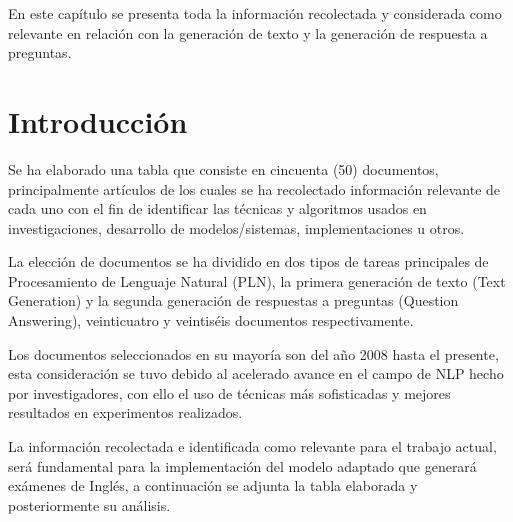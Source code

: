 \documentclass[../Main.tex]{subfiles}
\begin{document}
\begin{justify}
En este capítulo se presenta toda la información recolectada y considerada como relevante en relación con la generación de texto y la generación de respuesta a preguntas.
\end{justify}

\section{Introducción}
\begin{justify}
Se ha elaborado una tabla que consiste en cincuenta (50) documentos, principalmente artículos de los cuales se ha recolectado información relevante de cada uno con el fin de identificar las técnicas y algoritmos usados en investigaciones, desarrollo de modelos/sistemas, implementaciones u otros.
\end{justify}

\begin{justify}
La elección de documentos se ha dividido en dos tipos de tareas principales de Procesamiento de Lenguaje Natural (PLN), la primera generación de texto (Text Generation) y la segunda generación de respuestas a preguntas (Question Answering), veinticuatro y veintiséis documentos respectivamente.
\end{justify}

\begin{justify}
Los documentos seleccionados en su mayoría son del año 2008 hasta el presente, esta consideración se tuvo debido al acelerado avance en el campo de NLP hecho por investigadores, con ello el uso de técnicas más sofisticadas y mejores resultados en experimentos realizados.
\end{justify}

\begin{justify}
La información recolectada e identificada como relevante para el trabajo actual, será fundamental para la implementación del modelo adaptado que generará exámenes de Inglés, a continuación se adjunta la tabla elaborada y posteriormente su análisis.
\end{justify}
\end{document}
